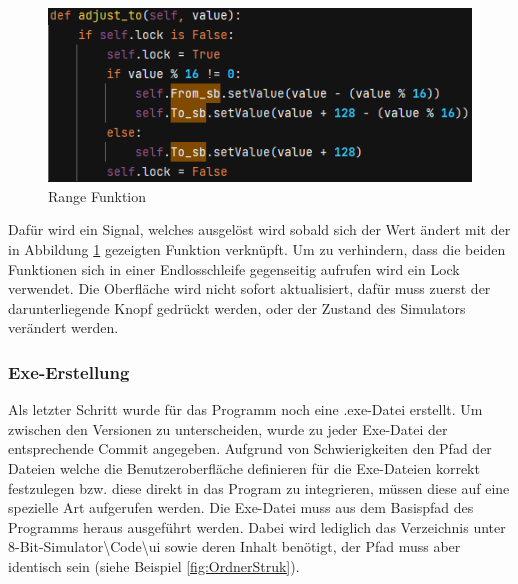 \documentclass[12pt]{article}
\newcommand{\imgSpaceBefore}{\vspace{10pt}}
\begin{document}
\begin{figure}[H]
\centering
\includegraphics[width=12cm]{bilder/Range_to}
\caption{Range Funktion}
\label{fig:RangeTo}
\end{figure}

\noindent
Dafür wird ein Signal, welches ausgelöst wird sobald sich der Wert ändert mit der in Abbildung \ref{fig:RangeTo} gezeigten Funktion verknüpft. Um zu verhindern, dass die beiden Funktionen sich in einer Endlosschleife gegenseitig aufrufen wird ein Lock verwendet. Die Oberfläche wird nicht sofort aktualisiert, dafür muss zuerst der darunterliegende Knopf gedrückt werden, oder der Zustand des Simulators verändert werden.

\newpage
\subsubsection{Exe-Erstellung}
Als letzter Schritt wurde für das Programm noch eine .exe-Datei erstellt. Um zwischen den Versionen zu unterscheiden, wurde zu jeder Exe-Datei der entsprechende Commit angegeben. Aufgrund von Schwierigkeiten den Pfad der Dateien welche die Benutzeroberfläche definieren für die Exe-Dateien korrekt festzulegen bzw. diese direkt in das Program zu integrieren, müssen diese auf eine spezielle Art aufgerufen werden. Die Exe-Datei muss aus dem Basispfad des Programms heraus ausgeführt werden. Dabei wird lediglich das Verzeichnis unter 8-Bit-Simulator\textbackslash Code\textbackslash ui sowie deren Inhalt benötigt, der Pfad muss aber identisch sein (siehe Beispiel \ref{fig:OrdnerStruk}).\imgSpaceBefore
\end{document}

